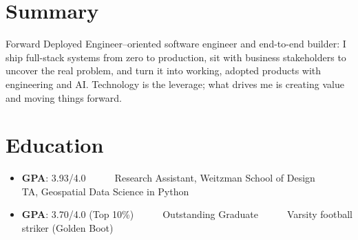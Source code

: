 \documentclass{resume}
\begin{document}



\section{Summary}
\vspace{0.5ex}
Forward Deployed Engineer--oriented software engineer and end-to-end builder: I ship full-stack systems from zero to production, sit with business stakeholders to uncover the real problem, and turn it into working, adopted products with engineering and AI. Technology is the leverage; what drives me is creating value and moving things forward.

\section{Education}

\begin{itemize}[parsep=0.4ex]
  \item \textbf{GPA}: 3.93/4.0 $\quad$ $\quad$ Research Assistant, Weitzman School of Design $\quad$ $\quad$ TA, Geospatial Data Science in Python
\end{itemize}

\begin{itemize}[parsep=0.4ex]
  \item \textbf{GPA}: 3.70/4.0 (Top 10\%) $\quad$ $\quad$ Outstanding Graduate $\quad$ $\quad$ Varsity football striker (Golden Boot)
\end{itemize}
\end{document}

